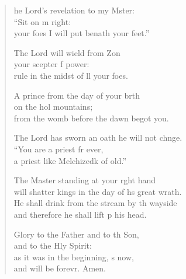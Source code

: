 \begin{verse}
  \begin{patverse}
he Lord’s revelation to my Mster:\Flex\\
“Sit on m right:\Med\\
your foes I will put benath your feet.”

The Lord will wield from Z\pointup{\i}on\Flex\\
your scepter f power:\Med\\
rule in the midst of ll your foes.

A prince from the day of your b\pointup{\i}rth\Flex\\
on the hol mountains;\Med\\
from the womb before the dawn  begot you.

The Lord has sworn an oath he will not chnge.\Flex\\
“You are a priest fr ever,\Med\\
a priest like Melchizedk of old.”

The Master standing at your r\pointup{\i}ght hand\Med\\
will shatter kings in the day of h\pointup{\i}s great wrath.\\
He shall drink from the stream by th wayside\Med\\
and therefore he shall lift p his head.

Glory to the Father and to th Son,\Med\\
and to the Hly Spirit:\\
as it was in the beginning, \pointup{\i}s now,\Med\\
and will be forevr. Amen.
  \end{patverse}
\end{verse}
